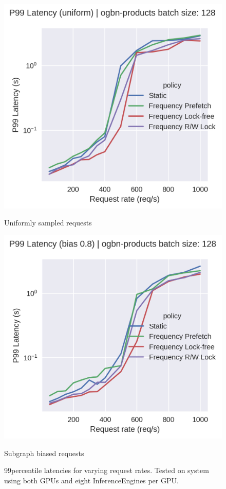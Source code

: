 \begin{figure}[h!]
    \centering
    \begin{minipage}[c]{0.48\textwidth}
        \centering
        \includegraphics[width=\textwidth]{figures/P99_latency_GCN_uniform_pinnedc0.2_gpus_3.png}
        \caption*{Uniformly sampled requests}
    \end{minipage}
    \hfill
    \begin{minipage}[c]{0.48\textwidth}
        \centering
        \includegraphics[width=\textwidth]{figures/P99_latency_GCN_bias_0.8_pinnedc0.2_gpus_3.png}    
        \caption*{Subgraph biased requests}
    \end{minipage}
    \caption{99\th percentile latencies for varying request rates. Tested on system using both GPUs and eight InferenceEngines per GPU.}
    \label{Eval: P99 latency}
\end{figure}  
